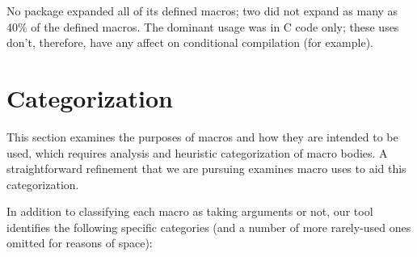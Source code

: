 \documentclass[11pt]{article}
\begin{document}
No package expanded all of its defined macros; two did not expand as many
as 40\% of the defined macros.  The dominant usage was in C code only;
these uses don't, therefore, have any affect on conditional compilation
(for example).


\section{Categorization}
\label{sec:categorization}

This section examines the purposes of macros and how they are intended to
be used, which requires analysis and heuristic categorization of macro
bodies.  A straightforward refinement that we are pursuing examines macro
uses to aid this categorization.

In addition to classifying each macro as taking arguments or not, our tool
identifies the following specific categories (and a number of more
rarely-used ones omitted for reasons of space):
\end{document}
